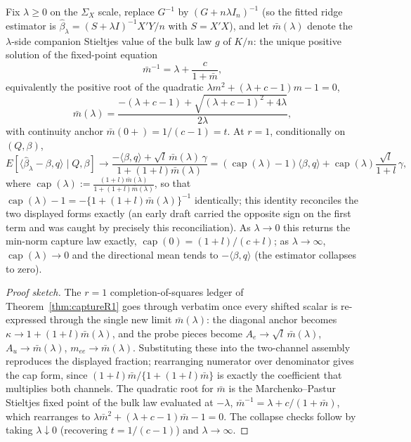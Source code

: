 \begin{proposition}\label{prop:ridgeCap}
Fix $\lambda\ge 0$ on the $\Sigma_X$ scale, replace $G^{-1}$ by $(G+n\lambda I_n)^{-1}$ (so the fitted ridge estimator is $\hat\beta_{\lambda}=(S+\lambda I)^{-1}X'Y/n$ with $S=X'X$), and let $\bar m(\lambda)$ denote the $\lambda$-side companion Stieltjes value of the bulk law $g$ of $K/n$: the unique positive solution of the fixed-point equation
\[
\bar m^{-1}=\lambda+\frac{c}{1+\bar m},
\]
equivalently the positive root of the quadratic $\lambda m^2+(\lambda+c-1)m-1=0$,
\[
\bar m(\lambda)=\frac{-(\lambda+c-1)+\sqrt{(\lambda+c-1)^2+4\lambda}}{2\lambda},
\]
with continuity anchor $\bar m(0+)=1/(c-1)=t$. At $r=1$, conditionally on $(Q,\beta)$,
\[
E[\langle\hat\beta_{\lambda}-\beta,q\rangle\mid Q,\beta]
\to\frac{-\langle\beta,q\rangle+\sqrt{l}\,\bar m(\lambda)\,\gamma}{1+(1+l)\bar m(\lambda)}
=(\operatorname{cap}(\lambda)-1)\langle\beta,q\rangle
+\operatorname{cap}(\lambda)\frac{\sqrt{l}}{1+l}\,\gamma,
\]
where $\displaystyle\operatorname{cap}(\lambda):=\frac{(1+l)\bar m(\lambda)}{1+(1+l)\bar m(\lambda)}$, so that $\operatorname{cap}(\lambda)-1=-\{1+(1+l)\bar m(\lambda)\}^{-1}$ identically; this identity reconciles the two displayed forms exactly (an early draft carried the opposite sign on the first term and was caught by precisely this reconciliation). As $\lambda\to 0$ this returns the min-norm capture law exactly, $\operatorname{cap}(0)=(1+l)/(c+l)$; as $\lambda\to\infty$, $\operatorname{cap}(\lambda)\to 0$ and the directional mean tends to $-\langle\beta,q\rangle$ (the estimator collapses to zero).
\end{proposition}

\begin{proof}[Proof sketch]
The $r=1$ completion-of-squares ledger of Theorem~\ref{thm:captureR1} goes through verbatim once every shifted scalar is re-expressed through the single new limit $\bar m(\lambda)$: the diagonal anchor becomes $\kappa\to1+(1+l)\bar m(\lambda)$, and the probe pieces become $A_e\to\sqrt{l}\,\bar m(\lambda)$, $A_u\to\bar m(\lambda)$, $m_{ee}\to\bar m(\lambda)$. Substituting these into the two-channel assembly reproduces the displayed fraction; rearranging numerator over denominator gives the cap form, since $(1+l)\bar m/\{1+(1+l)\bar m\}$ is exactly the coefficient that multiplies both channels. The quadratic root for $\bar m$ is the Marchenko--Pastur Stieltjes fixed point of the bulk law evaluated at $-\lambda$, $\bar m^{-1}=\lambda+c/(1+\bar m)$, which rearranges to $\lambda\bar m^2+(\lambda+c-1)\bar m-1=0$. The collapse checks follow by taking $\lambda\downarrow0$ (recovering $t=1/(c-1)$) and $\lambda\to\infty$.
\end{proof}

